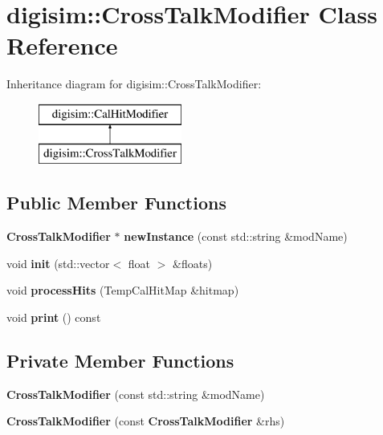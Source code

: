 \section{digisim\-:\-:Cross\-Talk\-Modifier Class Reference}
\label{classdigisim_1_1CrossTalkModifier}
Inheritance diagram for digisim\-:\-:Cross\-Talk\-Modifier\-:\begin{figure}[H]
\begin{center}
\leavevmode
\includegraphics[height=2.000000cm]{classdigisim_1_1CrossTalkModifier}
\end{center}
\end{figure}
\subsection*{Public Member Functions}
\begin{DoxyCompactItemize}
\item 
{\bf Cross\-Talk\-Modifier} $\ast$ {\bfseries new\-Instance} (const std\-::string \&mod\-Name)\label{classdigisim_1_1CrossTalkModifier_a815dbbbc6b62e59e26dc2837514a1170}

\item 
void {\bfseries init} (std\-::vector$<$ float $>$ \&floats)\label{classdigisim_1_1CrossTalkModifier_a0da6aa9e02508cd60634b5ca23d25f12}

\item 
void {\bfseries process\-Hits} (Temp\-Cal\-Hit\-Map \&hitmap)\label{classdigisim_1_1CrossTalkModifier_a7ce6493c5a974b37befa87bf2678e934}

\item 
void {\bfseries print} () const \label{classdigisim_1_1CrossTalkModifier_a8e085d278314de45acf7bcc983eefb0d}

\end{DoxyCompactItemize}
\subsection*{Private Member Functions}
\begin{DoxyCompactItemize}
\item 
{\bfseries Cross\-Talk\-Modifier} (const std\-::string \&mod\-Name)\label{classdigisim_1_1CrossTalkModifier_afff4eb14b9f944e69a91fde00dda72a5}

\item 
{\bfseries Cross\-Talk\-Modifier} (const {\bf Cross\-Talk\-Modifier} \&rhs)\label{classdigisim_1_1CrossTalkModifier_a21f2c0a9185904b8bf56738d40e67985}

\end{DoxyCompactItemize}
